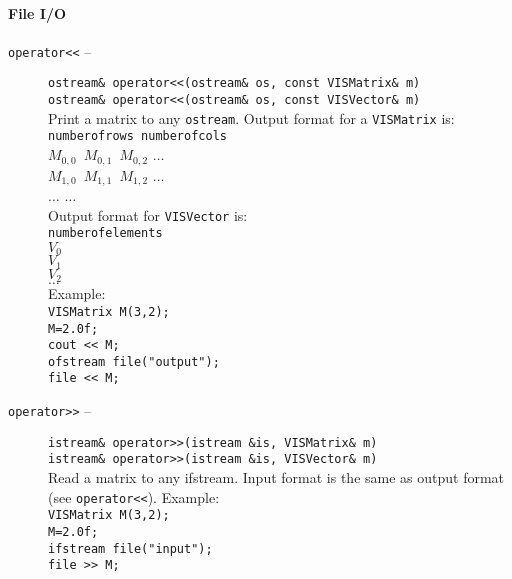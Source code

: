 \paragraph{File I/O}
\begin{description} 
 \item[{\tt operator<<} --]
{\tt ostream\& operator<<(ostream\& os, const VISMatrix\& m)}\\
{\tt ostream\& operator<<(ostream\& os, const VISVector\& m)}\\
Print a matrix to any {\tt ostream}.  Output format for a {\tt VISMatrix} is:\\
{\tt numberofrows numberofcols}\\
{\tt $M_{0,0}$ $M_{0,1}$ $M_{0,2}$} $\dots$\\
{\tt $M_{1,0}$ $M_{1,1}$ $M_{1,2}$} $\dots$\\
{\tt $\dots$} \hspace{0.25in} {\tt $\dots$}\\
\vspace*{0.25in}
Output format for {\tt VISVector} is:\\
{\tt numberofelements}\\
{\tt $V_0$}\\
{\tt $V_1$}\\
{\tt $V_2$}\\
{\tt $\dots$}\\
\vspace*{0.25in}
Example:\\ 
{\tt VISMatrix M(3,2);}\\
{\tt M=2.0f;}\\
{\tt cout << M;}\\
{\tt ofstream file("output");}\\
{\tt file << M;}
\item[{\tt operator>>} --]
{\tt istream\& operator>>(istream \&is, VISMatrix\& m)}\\
{\tt istream\& operator>>(istream \&is, VISVector\& m)}\\
Read a matrix to any ifstream.  Input format is the same as
output format (see {\tt operator<<}).  Example:\\
{\tt VISMatrix M(3,2);}\\
{\tt M=2.0f;}\\
{\tt ifstream file("input");}\\
{\tt file >> M;}
\end{description}

